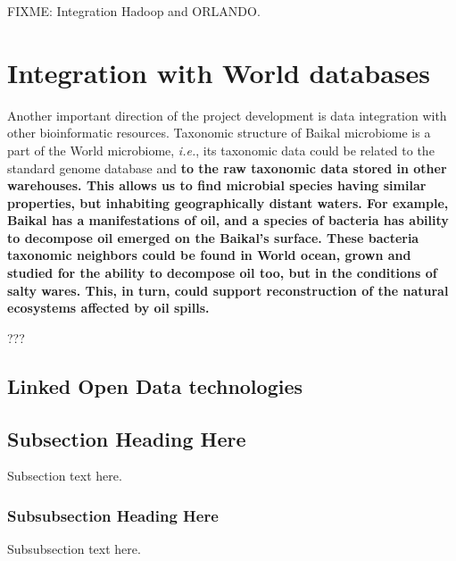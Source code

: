 \documentclass[conference,a4paper]{IEEEtran}
\begin{document}
FIXME: Integration Hadoop and ORLANDO.

\section{Integration with World databases}
\label{sec:integro}

Another important direction of the project development is data integration with other bioinformatic resources.  Taxonomic structure of Baikal microbiome is a part of the World microbiome, \emph{i.e.}, its taxonomic data could be related to the standard genome database and\textbf{ to the raw taxonomic data stored in other warehouses.  This allows us to find microbial species having similar properties, but inhabiting geographically distant waters.  For example, Baikal has a manifestations of oil, and a species of bacteria has ability to decompose oil emerged on the Baikal's surface.  These bacteria taxonomic neighbors could be found in World ocean, grown and studied for the ability to decompose oil too, but in the conditions of salty wares.  This, in turn, could support reconstruction of the natural ecosystems affected by oil spills.}

???

\subsection{Linked Open Data technologies}
\label{sec:LODint}


\subsection{Subsection Heading Here}
Subsection text here.


\subsubsection{Subsubsection Heading Here}
Subsubsection text here.


%
%
\end{document}
